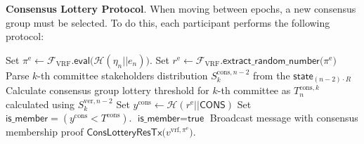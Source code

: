 \begin{protocol}
\begin{algorithmic}[1]
            \EndIf

        \EndIf

    \end{algorithmic}\label{alg:algorithm-5}
\end{protocol}


\bigbreak
\bigbreak
\noindent
\textbf{Consensus Lottery Protocol}.
When moving between epochs, a new consensus group must be selected.
To do this, each participant performs the following protocol:
\begin{protocol}
    \caption{$\textsf{ConsensusLottery}(P, e_n, \textsf{state}_{(n - 2)\cdot R}, k, \mathcal{C}_{\text{loc}})$}
    \begin{algorithmic}[1]
        \State Set ${\pi^{\text{e}}} \leftarrow \mathcal{F}_{\text{VRF}}\textsf{.eval(}\mathcal{H}(\eta_n || e_n) \textsf{)}$.
        \State Set ${r^{\text{e}} \leftarrow \mathcal{F}_{\text{VRF}}\textsf{.extract\_random\_number(}\pi^{\text{e}}\textsf{)}}$
        \State Parse $k$-th committee stakeholders distribution $S_k^{\text{cons}, n - 2}$ from the $\textsf{state}_{(n - 2)\cdot R}$
        \State Calculate consensus group lottery threshold for $k$-th committee as $T_n^{\text{cons}, k}$ calculated using $S_k^{\text{ver}, {n - 2}}$
        \State Set ${y^{\text{cons}} \leftarrow {\mathcal{H}(r^{\text{e}} || \textsf{CONS})}}$
        \State Set ${\textsf{is\_member} = (y^{\text{cons}} < T^{\text{cons}})}$.
        \If
            $\textsf{is\_member} = \textsf{true}$
            \State Broadcast message with consensus membership proof $\textsf{ConsLotteryResTx(}v^{\text{vrf}, \pi^{\text{e}}}\textsf{)}$.
        \EndIf

    \end{algorithmic}\label{alg:algorithm-8}
\end{protocol}


